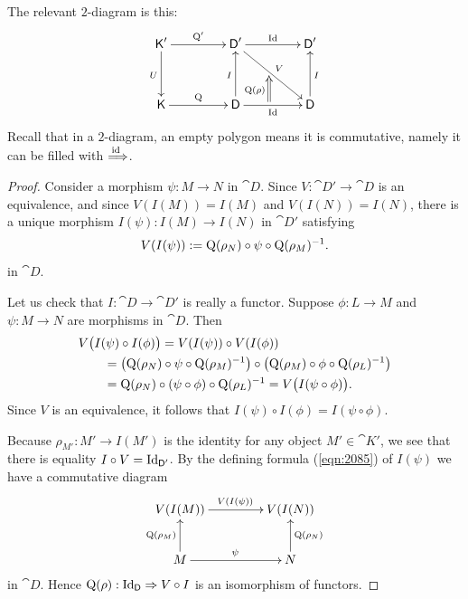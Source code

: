 The relevant $2$-diagram is this: 
\[ \UseTips  \xymatrix @C=10ex @R=8ex {
\cat{K}'
\ar[r]^{\opn{Q}'}
\ar[d]_{U}
&
\cat{D}'
\ar[dr]^{V} _(0.45){}="t" 
\ar[r]^{\opn{Id}}
&
\cat{D}'
\\
\cat{K}
\ar[r]^{\opn{Q}} _{}="q"
&
\cat{D} 
\ar[u]^{I}
\ar[r]_{\opn{Id}} ^(0.45){}="s"
\ar@{=>}  "s";"t" ^(0.45){\opn{Q}(\rho)}
&
\cat{D} 
\ar[u]_{I}
} \]
Recall that in a $2$-diagram, an empty polygon means it is commutative, namely 
it can be filled with 
$\stackrel{\operatorname{id} \ }{\Longrightarrow}$. 

\begin{proof}
Consider a morphism $\psi : M \to N$ in $\cat{D}$.
Since $V : \cat{D}' \to \cat{D}$ is an equivalence, and since 
$V(I(M)) = I(M)$ and $V(I(N)) = I(N)$, there is a unique morphism 
$I(\psi) : I(M) \to I(N)$ 
in $\cat{D}'$ satisfying 
\begin{equation} \label{eqn:2085}
V(I(\psi)) := \operatorname{Q}(\rho_N) \circ \psi \circ \operatorname{Q}(\rho_M)^{-1} . 
\end{equation}
in $\cat{D}$. 

Let us check that $I : \cat{D} \to \cat{D}'$ is really a functor. 
Suppose $\phi : L \to M$ and $\psi : M \to N$ are morphisms in $\cat{D}$. 
Then 
\[ \begin{aligned}
& V \bigl( I(\psi) \circ I(\phi) \bigr) =  V(I(\psi)) \circ V(I(\phi))
\\ & \qquad 
 = \bigl( \operatorname{Q}(\rho_N) \circ \psi \circ \operatorname{Q}(\rho_M)^{-1} \bigr) \circ 
\bigl( \operatorname{Q}(\rho_M) \circ \phi \circ \operatorname{Q}(\rho_L)^{-1} \bigr)
\\ & \qquad 
= \operatorname{Q}(\rho_N) \circ (\psi \circ \phi) \circ \operatorname{Q}(\rho_L)^{-1} 
= V \bigl( I(\psi \circ \phi) \bigr) . 
\end{aligned} \]
Since $V$ is an equivalence, it follows that 
$I(\psi) \circ I(\phi) = I(\psi \circ \phi)$. 

Because $\rho_{M'} : M' \to I(M')$ is the identity for any object 
$M' \in \cat{K}'$, we see that there is equality 
$I \circ V = \operatorname{Id}_{\operatorname{\mathsf{D}}'}$. 
By the defining formula (\ref{eqn:2085}) of $I(\psi)$ we have a commutative 
diagram 
\[ \UseTips  \xymatrix @C=10ex @R=6ex {
V(I(M))
\ar[r]^{V(I(\psi))}
&
V(I(N))
\\
M
\ar[r]^{\psi}
\ar[u]^{\opn{Q}(\rho_M)}
&
N
\ar[u]_{\opn{Q}(\rho_N)}
} \]
in $\cat{D}$. Hence $\operatorname{Q}(\rho) : \operatorname{Id}_{\operatorname{\mathsf{D}}} \Rightarrow V \circ I$
is an isomorphism of functors.
\end{proof}

